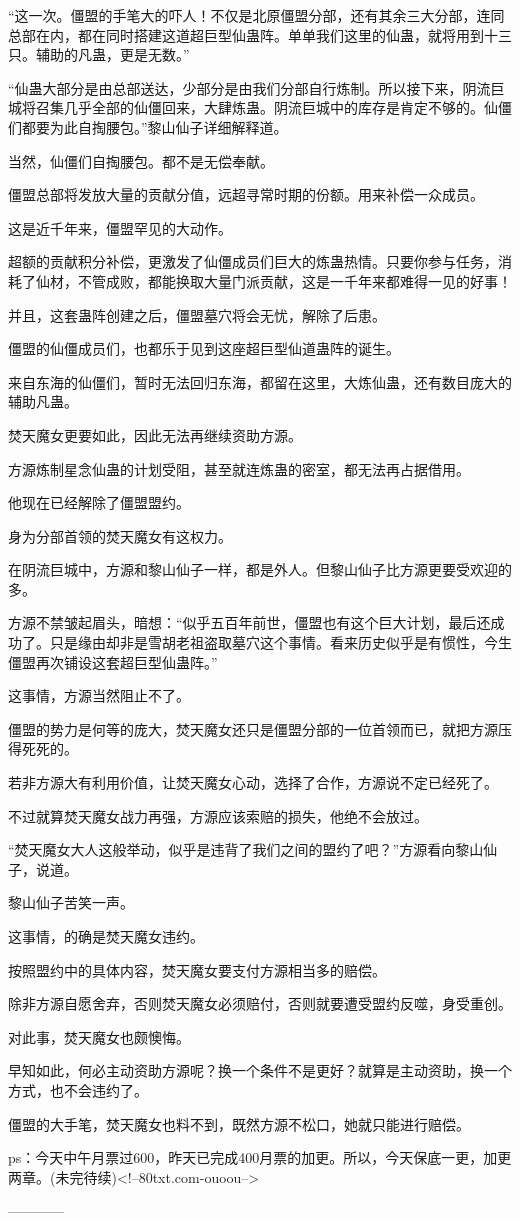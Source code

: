\begin{this_body}
“这一次。僵盟的手笔大的吓人！不仅是北原僵盟分部，还有其余三大分部，连同总部在内，都在同时搭建这道超巨型仙蛊阵。单单我们这里的仙蛊，就将用到十三只。辅助的凡蛊，更是无数。”

“仙蛊大部分是由总部送达，少部分是由我们分部自行炼制。所以接下来，阴流巨城将召集几乎全部的仙僵回来，大肆炼蛊。阴流巨城中的库存是肯定不够的。仙僵们都要为此自掏腰包。”黎山仙子详细解释道。

当然，仙僵们自掏腰包。都不是无偿奉献。

僵盟总部将发放大量的贡献分值，远超寻常时期的份额。用来补偿一众成员。

这是近千年来，僵盟罕见的大动作。

超额的贡献积分补偿，更激发了仙僵成员们巨大的炼蛊热情。只要你参与任务，消耗了仙材，不管成败，都能换取大量门派贡献，这是一千年来都难得一见的好事！

并且，这套蛊阵创建之后，僵盟墓穴将会无忧，解除了后患。

僵盟的仙僵成员们，也都乐于见到这座超巨型仙道蛊阵的诞生。

来自东海的仙僵们，暂时无法回归东海，都留在这里，大炼仙蛊，还有数目庞大的辅助凡蛊。

焚天魔女更要如此，因此无法再继续资助方源。

方源炼制星念仙蛊的计划受阻，甚至就连炼蛊的密室，都无法再占据借用。

他现在已经解除了僵盟盟约。

身为分部首领的焚天魔女有这权力。

在阴流巨城中，方源和黎山仙子一样，都是外人。但黎山仙子比方源更要受欢迎的多。

方源不禁皱起眉头，暗想：“似乎五百年前世，僵盟也有这个巨大计划，最后还成功了。只是缘由却非是雪胡老祖盗取墓穴这个事情。看来历史似乎是有惯性，今生僵盟再次铺设这套超巨型仙蛊阵。”

这事情，方源当然阻止不了。

僵盟的势力是何等的庞大，焚天魔女还只是僵盟分部的一位首领而已，就把方源压得死死的。

若非方源大有利用价值，让焚天魔女心动，选择了合作，方源说不定已经死了。

不过就算焚天魔女战力再强，方源应该索赔的损失，他绝不会放过。

“焚天魔女大人这般举动，似乎是违背了我们之间的盟约了吧？”方源看向黎山仙子，说道。

黎山仙子苦笑一声。

这事情，的确是焚天魔女违约。

按照盟约中的具体内容，焚天魔女要支付方源相当多的赔偿。

除非方源自愿舍弃，否则焚天魔女必须赔付，否则就要遭受盟约反噬，身受重创。

对此事，焚天魔女也颇懊悔。

早知如此，何必主动资助方源呢？换一个条件不是更好？就算是主动资助，换一个方式，也不会违约了。

僵盟的大手笔，焚天魔女也料不到，既然方源不松口，她就只能进行赔偿。

ps：今天中午月票过600，昨天已完成400月票的加更。所以，今天保底一更，加更两章。(未完待续)<!--80txt.com-ouoou-->

------------

\end{this_body}

